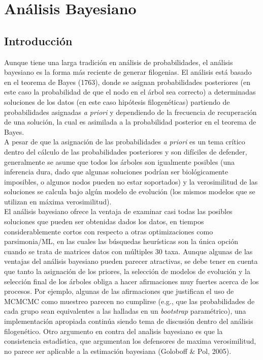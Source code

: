 \chapter{An\'alisis Bayesiano}
\section*{Introducci\'on}
Aunque tiene una larga tradici\'on en an\'alisis de probabilidades, el an\'alisis bayesiano es la forma m\'as reciente de generar filogenias.  El an\'alisis est\'a basado en el teorema de Bayes (1763), donde se asignan probabilidades posteriores (en este caso la probabilidad de que el nodo en el \'arbol sea correcto) a determinadas soluciones de los datos (en este caso hip\'otesis filogen\'eticas) partiendo de probabilidades asignadas \textit{a priori} y dependiendo de la frecuencia de recuperaci\'on de una soluci\'on, la cual es asimilada a la probabilidad posterior en el teorema de Bayes.\\
A pesar de que la asignaci\'on de las probabilidades  \textit{a priori} es un tema cr\'itico dentro del c\'alculo de las probabilidades posteriores y son dif\'iciles de defender, generalmente se asume
que todos los \'arboles son igualmente posibles (una inferencia dura, dado que algunas soluciones 
podr\'ian ser biol\'ogicamente imposibles, o algunos nodos pueden no estar soportados) y la verosimilitud de las soluciones se calcula bajo alg\'un modelo de evoluci\'on (los mismos modelos que se utilizan en m\'axima verosimilitud).\\
El an\'alisis bayesiano ofrece la ventaja de examinar casi todas las posibles soluciones que pueden ser obtenidas dados los datos, en tiempos considerablemente cortos con respecto a otras optimizaciones como parsimonia/ML, en las cuales las b\'usquedas heur\'isticas son la \'unica opci\'on cuando se trata de matrices datos con m\'ultiples 30 taxa. Aunque algunas de las ventajas del an\'alisis bayesiano pueden parecer atractivas, se debe tener en cuenta que tanto la asignaci\'on de los priores, la selecci\'on de modelos de evoluci\'on y la selecci\'on final de los \'arboles obliga a hacer afirmaciones muy fuertes acerca de los procesos. Por ejemplo, algunas de las afirmaciones que justifican el uso de MCMCMC como muestreo parecen no cumplirse (e.g., que las probabilidades de cada grupo sean equivalentes a las halladas en un \textit{bootstrap} param\'etrico), una implementaci\'on apropiada contin\'ua siendo tema de discusi\'on dentro del an\'alisis filogen\'etico. Otro argumento en contra del analisis bayesiano es que la consistencia estad\'istica, que argumentan los defensores de maxima verosimilitud, no parece ser aplicable a la estimaci\'on bayesiana (Goloboff \& Pol, 2005).
\\
